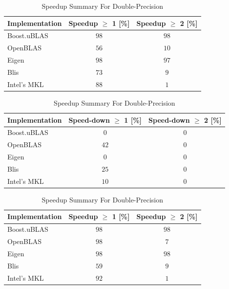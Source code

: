 \begin{table}[ht]
    \centering
    \caption{Speedup Summary For Single-Precision}
    \begin{tabular}{|l|c|c|}
        \hline
        \textbf{Implementation} & \textbf{Speedup $\geq$ 1 [\%]} & \textbf{Speedup $\geq$ 2 [\%]}\\
        \hline
        Boost.uBLAS & $98$ & $98$ \\
        \hline
        OpenBLAS    & $56$ & $10$ \\
        \hline
        Eigen       & $98$ & $97$ \\
        \hline
        Blis        & $73$ & $9$ \\
        \hline
        Intel's MKL & $88$ & $1$ \\
        \hline
    \end{tabular}
    
    \begin{tabular}{|l|c|c|}
        \hline
        \textbf{Implementation} & \textbf{Speed-down $\geq$ 1 [\%]} & \textbf{Speed-down $\geq$ 2 [\%]}\\
        \hline
        Boost.uBLAS & $0$ & $0$ \\
        \hline
        OpenBLAS    & $42$ & $0$ \\
        \hline
        Eigen       & $0$ & $0$ \\
        \hline
        Blis        & $25$ & $0$ \\
        \hline
        Intel's MKL & $10$ & $0$ \\
        \hline
    \end{tabular}
    
    \vspace*{1 cm}

    \centering
    \caption{Speedup Summary For Double-Precision}
    \begin{tabular}{|l|c|c|}
        \hline
        \textbf{Implementation} & \textbf{Speedup $\geq$ 1 [\%]} & \textbf{Speedup $\geq$ 2 [\%]}\\
        \hline
        Boost.uBLAS & $98$ & $98$ \\
        \hline
        OpenBLAS    & $98$ & $7$ \\
        \hline
        Eigen       & $98$ & $98$ \\
        \hline
        Blis        & $59$ & $9$ \\
        \hline
        Intel's MKL & $92$ & $1$ \\
        \hline
    \end{tabular}
    

\end{table}

